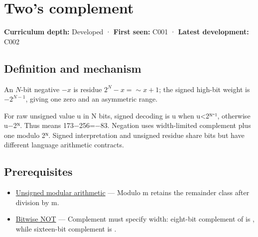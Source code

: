 \hypertarget{appendix-4fbc03d20829}{}\label{referencestart:appendix-4fbc03d20829}
\section{Two's complement}\label{appendix-4fbc03d20829-twos-complement}

\hypertarget{appendix-4fbc03d20829-twos-complement}{}

\textbf{Curriculum depth:} Developed · \textbf{First seen:} C001 · \textbf{Latest development:} C002

\begin{allmightroledefinition}

\subsection{Definition and mechanism}\label{appendix-4fbc03d20829-definition-and-mechanism}

\hypertarget{appendix-4fbc03d20829-definition-and-mechanism}{}

An \(N\)-bit negative \(-x\) is residue \(2^N-x=\sim x+1\); the signed high-bit weight is \(-2^{N-1}\), giving one zero and an asymmetric range.

\end{allmightroledefinition}

For raw unsigned value u in N bits, signed decoding is u when u\textless2ᴺ⁻¹, otherwise u−2ᴺ. Thus  means 173−256=−83. Negation uses width-limited complement plus one modulo 2ᴺ. Signed interpretation and unsigned residue share bits but have different language arithmetic contracts.

\subsection{Prerequisites}\label{appendix-4fbc03d20829-prerequisites}

\hypertarget{appendix-4fbc03d20829-prerequisites}{}

\begin{itemize}
\tightlist
\item
  \hyperref[appendix-c99977d88b33]{Unsigned modular arithmetic} --- Modulo m retains the remainder class after division by m.
\item
  \hyperref[appendix-8f38927cfc54]{Bitwise NOT} --- Complement must specify width: eight-bit complement of  is , while sixteen-bit complement is .
\end{itemize}

